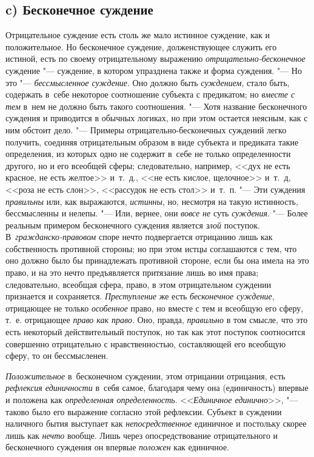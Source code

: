 \subsection[c) Бесконечное суждение]{c) Бесконечное суждение}
Отрицательное суждение есть столь же мало истинное суждение,
как и положительное. Но бесконечное суждение, долженствующее служить его
истиной, есть по своему отрицательному выражению {\em отрицательно-бесконечное}
суждение "--- суждение, в котором упразднена также и форма суждения. "--- Но
это "--- {\em бессмысленное суждение}. Оно должно быть {\em суждением}, стало
быть, содержать в~себе некоторое соотношение субъекта с предикатом; но
{\em вместе с тем} в~нем не должно быть такого соотношения. "--- Хотя название
бесконечного суждения и приводится в обычных логиках, но при этом остается
неясным, как с ним обстоит дело. "--- Примеры
отрицательно-бесконечных суждений легко получить, соединяя отрицательным
образом в виде субъекта и предиката такие определения, из которых одно не
содержит в~себе не только определенности другого, но и его всеобщей сферы;
следовательно, например, <<дух не есть красное, не есть желтое>> и~т.~д., <<не
есть кислое, щелочное>> и~т.~д, <<роза не есть слон>>, <<рассудок не есть
стол>> и~т.~п. "--- Эти суждения {\em правильны} или, как выражаются,
{\em истинны}, но, несмотря на такую истинность, бессмысленны и нелепы. "---
Или, вернее, они {\em вовсе не} суть {\em суждения}. "--- Более
реальным примером бесконечного суждения является
{\em злой} поступок. В~{\em гражданско-правовом}
споре нечто подвергается отрицанию лишь как собственность
противной стороны; но при этом истцы соглашаются с тем, что оно должно было
бы принадлежать противной стороне, если бы она имела на это право, и на это
нечто предъявляется притязание лишь во имя права; следовательно, всеобщая
сфера, право, в этом отрицательном суждении признается и сохраняется.
{\em Преступление} же есть {\em бесконечное суждение}, отрицающее не только
{\em особенное} право, но вместе с тем и всеобщую его сферу, т.~е. отрицающее
{\em право как право}. Оно, правда, {\em правильно} в том
смысле, что это есть некоторый действительный поступок, но так как этот
поступок соотносится совершенно отрицательно с нравственностью,
составляющей его всеобщую сферу, то он бессмысленен.

{\em Положительное} в~бесконечном суждении, этом отрицании отрицания, есть
{\em рефлексия единичности} в~себя самое, благодаря чему она (единичность)
впервые и положена как {\em определенная определенность}.
<<{\em Единичное единично}>>, "--- таково было его выражение согласно этой
рефлексии. Субъект в суждении наличного бытия выступает как
{\em непосредственное} единичное и постольку скорее лишь как {\em нечто}
вообще. Лишь через опосредствование отрицательного и бесконечного суждения
он впервые {\em положен} как единичное.

